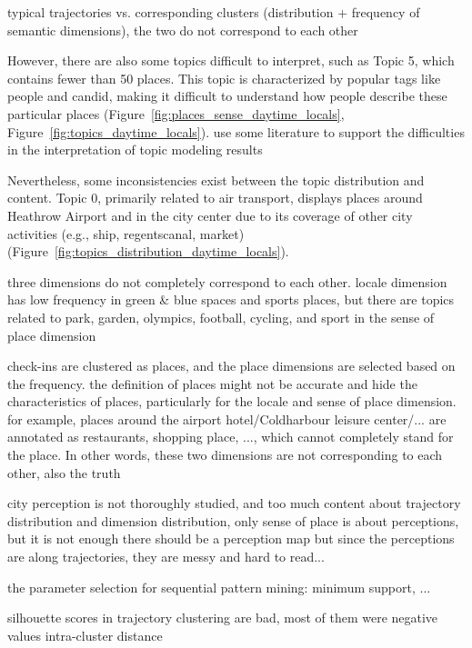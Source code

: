 \documentclass{article}
\theoremstyle{remark}
\begin{document}
typical trajectories vs. corresponding clusters (distribution + frequency of semantic dimensions), the two do not correspond to each other

However, there are also some topics difficult to interpret, such as Topic 5, which contains fewer than 50 places. This topic is characterized by popular tags like people and candid, making it difficult to understand how people describe these particular places (Figure~\ref{fig:places_sense_daytime_locals}, Figure~\ref{fig:topics_daytime_locals}).
use some literature to support the difficulties in the interpretation of topic modeling results

Nevertheless, some inconsistencies exist between the topic distribution and content. Topic 0, primarily related to air transport, displays places around Heathrow Airport and in the city center due to its coverage of other city activities (e.g., ship, regentscanal, market) (Figure~\ref{fig:topics_distribution_daytime_locals}).

three dimensions do not completely correspond to each other. locale dimension has low frequency in green \& blue spaces and sports places, but there are topics related to park, garden, olympics, football, cycling, and sport in the sense of place dimension

check-ins are clustered as places, and the place dimensions are selected based on the frequency. the definition of places might not be accurate and hide the characteristics of places, particularly for the locale and sense of place dimension. for example, places around the airport hotel/Coldharbour leisure center/... are annotated as restaurants, shopping place, ..., which cannot completely stand for the place. In other words, these two dimensions are not corresponding to each other, also the truth


city perception is not thoroughly studied, and too much content about trajectory distribution and dimension distribution, only sense of place is about perceptions, but it is not enough
there should be a perception map but since the perceptions are along trajectories, they are messy and hard to read...

the parameter selection for sequential pattern mining: minimum support, ...

silhouette scores in trajectory clustering are bad, most of them were negative values
intra-cluster distance
\end{document}
